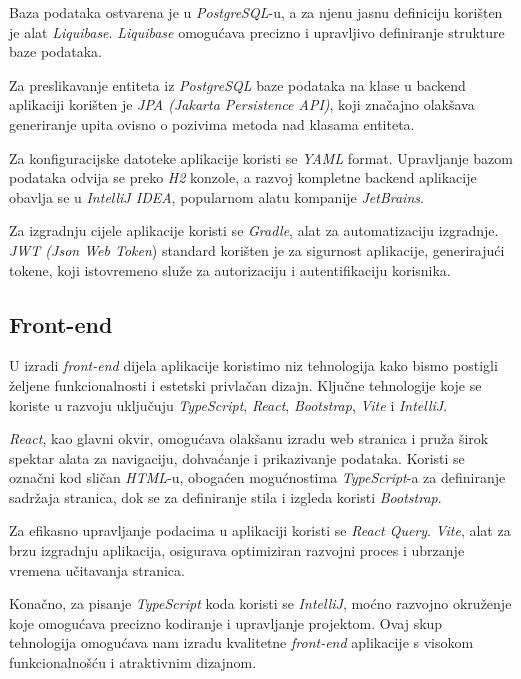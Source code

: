 		Baza podataka ostvarena je u \textit{PostgreSQL}-u, a za njenu jasnu definiciju korišten je alat \textit{Liquibase}. \textit{Liquibase} omogućava precizno i upravljivo definiranje strukture baze podataka.
		
		Za preslikavanje entiteta iz \textit{PostgreSQL} baze podataka na klase u backend aplikaciji korišten je \textit{JPA (Jakarta Persistence API)}, koji značajno olakšava generiranje upita ovisno o pozivima metoda nad klasama entiteta. 
		
		Za konfiguracijske datoteke aplikacije koristi se \textit{YAML} format. Upravljanje bazom podataka odvija se preko \textit{H2} konzole, a razvoj kompletne backend aplikacije obavlja se u \textit{IntelliJ IDEA}, popularnom alatu kompanije \textit{JetBrains}. 
		
		Za izgradnju cijele aplikacije koristi se \textit{Gradle}, alat za automatizaciju izgradnje. 
\textit{JWT (Json Web Token}) standard korišten je za sigurnost aplikacije, generirajući tokene, koji istovremeno služe za autorizaciju i autentifikaciju korisnika.


			\subsection{Front-end}
			U izradi \textit{front-end} dijela aplikacije koristimo niz tehnologija kako bismo postigli željene funkcionalnosti i estetski privlačan dizajn. Ključne tehnologije koje se koriste u razvoju uključuju \textit{TypeScript}, \textit{React}, \textit{Bootstrap}, \textit{Vite} i \textit{IntelliJ}.
			
\textit{React}, kao glavni okvir, omogućava olakšanu izradu web stranica i pruža širok spektar alata za navigaciju, dohvaćanje i prikazivanje podataka. Koristi se označni kod sličan \textit{HTML}-u, obogaćen mogućnostima \textit{TypeScript}-a za definiranje sadržaja stranica, dok se za definiranje stila i izgleda koristi \textit{Bootstrap}.

Za efikasno upravljanje podacima u aplikaciji koristi se \textit{React Query}. \textit{Vite}, alat za brzu izgradnju aplikacija, osigurava optimiziran razvojni proces i ubrzanje vremena učitavanja stranica.

Konačno, za pisanje \textit{TypeScript} koda koristi se \textit{IntelliJ}, moćno razvojno okruženje koje omogućava precizno kodiranje i upravljanje projektom. Ovaj skup tehnologija omogućava nam izradu kvalitetne \textit{front-end} aplikacije s visokom funkcionalnošću i atraktivnim dizajnom.\\
		
